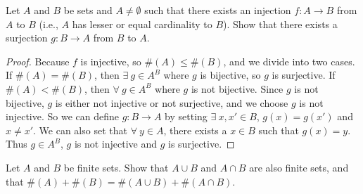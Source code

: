 \begin{exercise}\label{ex 3.6.8}
    Let \(A\) and \(B\) be sets and \(A \neq \emptyset\) such that there exists an injection \(f : A \to B\) from \(A\) to \(B\) (i.e., \(A\) has lesser or equal cardinality to \(B\)).
    Show that there exists a surjection \(g : B \to A\) from \(B\) to \(A\).
\end{exercise}

\begin{proof}
    Because \(f\) is injective, so \(\#(A) \leq \#(B)\), and we divide into two cases.
    If \(\#(A) = \#(B)\), then \(\exists\ g \in A^B\) where \(g\) is bijective, so \(g\) is surjective.
    If \(\#(A) < \#(B)\), then \(\forall\ g \in A^B\) where \(g\) is not bijective.
    Since \(g\) is not bijective, \(g\) is either not injective or not surjective, and we choose \(g\) is not injective.
    So we can define \(g : B \to A\) by setting \(\exists\ x, x' \in B\), \(g(x) = g(x')\) and \(x \neq x'\).
    We can also set that \(\forall\ y \in A\), there exists a \(x \in B\) such that \(g(x) = y\).
    Thus \(g \in A^B\), \(g\) is not injective and \(g\) is surjective.
\end{proof}

\begin{exercise}\label{ex 3.6.9}
    Let \(A\) and \(B\) be finite sets.
    Show that \(A \cup B\) and \(A \cap B\) are also finite sets, and that \(\#(A) + \#(B) = \#(A \cup B) + \#(A \cap B)\).
\end{exercise}

